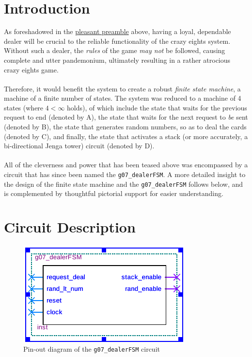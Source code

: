 \documentclass[12pt]{report}
\begin{document}
\chapter*{Introduction}
As foreshadowed in the \hyperref[s:preamble]{pleasant preamble} above, having a loyal, dependable
dealer will be crucial to the reliable functionality of the crazy eights system. Without such a
dealer, the \textit{rules} of the game \textit{may not} be followed, causing complete and utter
pandemonium, ultimately resulting in a rather atrocious crazy eights game.\\\\
Therefore, it would benefit the system to create a robust \textit{finite state machine}, a machine
of a finite number of states. The system was reduced to a machine of 4 states (where $4 < \infty$
holds), of which include the state that waits for the previous request to end (denoted by A), the state
that waits for the next request to \textit{be} sent (denoted by B), the state that generates
random numbers, so as to deal the cards (denoted by C), and finally, the state that activates a
stack (or more accurately, a bi-directional Jenga tower) circuit (denoted by D). \\\\
All of the cleverness and power that has been teased above was encompassed by a circuit that has
since been named the \texttt{g07\_dealerFSM}. A more detailed insight to the design of the finite
state machine and the \texttt{g07\_dealerFSM} follows below, and is complemented by thoughtful
pictorial support for easier understanding.

\chapter*{Circuit Description}

\begin{figure}[h]
	\begin{center}
		\caption{Pin-out diagram of the \texttt{g07\_dealerFSM} circuit}
		\includegraphics[scale=1.3]{dealer_symb}
	\end{center}
\end{figure}
\end{document}
